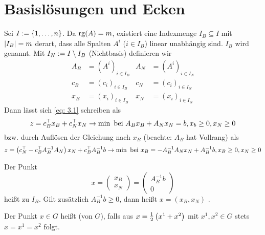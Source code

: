 \section{Basislösungen und Ecken}

Sei $I \mathrel{:=} \left\{ 1, \dots , n \right\}$. Da $\operatorname{rg}(A) = m$, existiert eine Indexmenge $I_B \subseteq I$ mit $\left| I_B \right| = m$ derart, dass alle Spalten $A^i$ ($i \in I_B$) linear unabhängig sind. $I_B$ wird  genannt. Mit $I_N \mathrel{:=} I \setminus I_B$ (Nichtbasis) definieren wir
\begin{align*}
A_B &= (A^i)_{i \in I_B} & A_N &= (A^i)_{i \in I_N} \\
c_B &= (c_i)_{i \in I_B} & c_N &= (c_i)_{i \in I_N} \\
x_B &= (x_i)_{i \in I_B} & x_N &= (x_i)_{i \in I_N}
\end{align*}
Dann lässt sich \eqref{eq: 3.1} schreiben als
\begin{equation}
	z = c_B^{\top} x_B + c_N^{\top} x_N \to \min \text{ bei } A_B x_B + A_N x_N = b, x_b \ge 0, x_N \ge 0 \label{eq: 3.2}
\end{equation}
bzw. durch Auflösen der Gleichung nach $x_B$ (beachte: $A_B$ hat Vollrang) als
\begin{equation}
	z = \left( c_N^{\top} - c_B^{\top} A_B^{-1}A_N \right) x_N + c_B^{\top} A_B^{-1} b \to \min \text{ bei } x_B = -A_B^{-1} A_N x_N + A_B^{-1}b, x_B \ge 0, x_N \ge 0 \label{eq: 3.3}
\end{equation}

\begin{definition} %
	Der Punkt 
	\begin{equation*}
		x = \left(\begin{matrix} x_B \\ x_N \end{matrix} \right) = \left( \begin{matrix} A_B^{-1} b \\ 0 \end{matrix} \right)
	\end{equation*}
	heißt  zu  $I_B$. Gilt zusätzlich $A_B^{-1}b \ge 0$, dann heißt $x=(x_B,x_N)$ .
\end{definition}

\begin{definition} %
	Der Punkt $x \in G$ heißt  (von $G$), falls aus $x = \frac{1}{2} \left( x^1 + x^2 \right)$ mit $x^1,x^2 \in G$ stets $x = x^1 = x^2$ folgt.
\end{definition}

